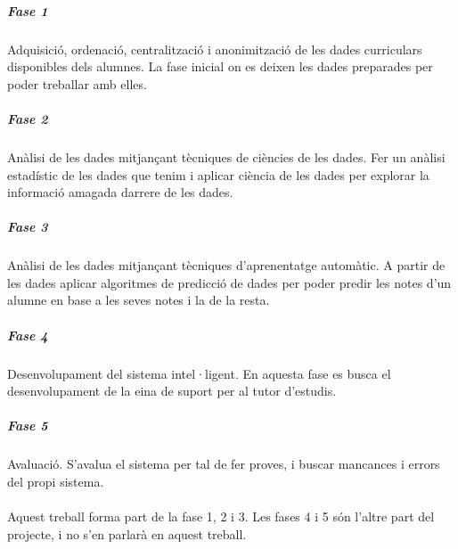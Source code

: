 \documentclass[12pt,a4paper,catalan]{article}
\begin{document}
\subparagraph{Fase 1}
Adquisició, ordenació, centralització i anonimització de les dades curriculars disponibles dels alumnes. La fase inicial on es deixen les dades preparades per poder treballar amb elles.

\subparagraph{Fase 2}
Anàlisi de les dades mitjançant tècniques de ciències de les dades. Fer un anàlisi estadístic de les dades que tenim i aplicar ciència de les dades per explorar la informació amagada darrere de les dades.

\subparagraph{Fase 3}
Anàlisi de les dades mitjançant tècniques d’aprenentatge automàtic. A partir de les dades aplicar algoritmes de predicció de dades per poder predir les notes d'un alumne en base a les seves notes i la de la resta.

\subparagraph{Fase 4}
Desenvolupament del sistema intel·ligent. En aquesta fase es busca el desenvolupament de la eina de suport per al tutor d'estudis.

\subparagraph{Fase 5}
Avaluació. S'avalua el sistema per tal de fer proves, i buscar mancances i errors del propi sistema.
\\
\\
Aquest treball forma part de la fase 1, 2 i 3. Les fases 4 i 5 són l'altre part del projecte, i no s'en parlarà en aquest treball.
\end{document}
